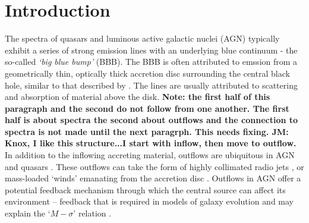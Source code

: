 \documentclass[preprint, a4paper, 11pt]{aastex}
\begin{document}
\maketitle



%
%

\section{Introduction}

The spectra of 
quasars and luminous active galactic nuclei (AGN) 
typically exhibit a series of strong emission lines
with an underlying blue continuum - the so-called {\sl `big blue bump'} (BBB). 
The BBB is often attributed to emssion from a 
geometrically thin, optically thick accretion disc surrounding the central black hole, similar
to that described by \cite{shakurasunyaev1973}.  The lines are usually attributed to scattering and absorption of material above the disk.  
{\bf Note: the first half of this paragraph and the second do not follow from one another.  
The first half is about spectra the second about outflows and the connection to spectra is not made until the next paragrph.  
This needs fixing. JM: Knox, I like this structure...I start with inflow, then move to outflow.}
In addition to the inflowing accreting material, 
outflows are ubiquitous in AGN
and quasars \citep{kellerman1989,ganguly2008}. These outflows can take the form of 
highly collimated radio jets \citep[e.g.][]{hazard1963,potash1980,perley1984,marscher2006}, 
or mass-loaded `winds' emanating from the accretion disc 
\citep{weymann1991,turnermiller2009}. 
Outflows in AGN offer a 
potential feedback mechanism through which the central source can 
affect its environment \citep{king2003,king2005,fabian2012}
-- feedback that is required in models of galaxy evolution \citep{springel2005}
and may explain the `$M-\sigma$' relation \citep{silkrees1998,haring2004}.
\end{document}
